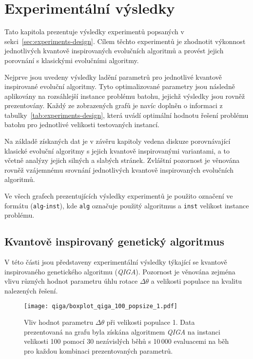 \chapter{Experimentální výsledky} \label{chapt:experiments}
Tato kapitola prezentuje výsledky experimentů popsaných v sekci~\ref{sec:experiments-design}. 
Cílem těchto experimentů je zhodnotit výkonnost jednotlivých kvantově inspirovaných evolučních algoritmů a provést jejich porovnání s klasickými evolučními algoritmy. 

Nejprve jsou uvedeny výsledky ladění parametrů pro jednotlivé kvantově inspirované evoluční algoritmy. 
Tyto optimalizované parametry jsou následně aplikovány na rozsáhlejší instance problému batohu, jejichž výsledky jsou rovněž prezentovány. 
Každý ze zobrazených grafů je navíc doplněn o informaci z tabulky~\ref{tab:experiments-design}, která uvádí optimální hodnotu řešení problému batohu pro jednotlivé velikosti testovaných instancí.

Na základě získaných dat je v závěru kapitoly vedena diskuze porovnávající klasické evoluční algoritmy s jejich kvantově inspirovanými variantami, a to včetně analýzy jejich silných a slabých stránek. 
Zvláštní pozornost je věnována rovněž vzájemnému srovnání jednotlivých kvantově inspirovaných evolučních algoritmů. 

Ve všech grafech prezentujících výsledky experimentů je použito označení ve formátu (\texttt{alg}-\texttt{inst}), kde \texttt{alg} označuje použitý algoritmus a \texttt{inst} velikost instance problému. 

\section{Kvantově inspirovaný genetický algoritmus}\label{sec:exp-qisa}
V této části jsou představeny experimentální výsledky týkající se kvantově inspirovaného genetického algoritmu (\emph{QIGA}). 
Pozornost je věnována zejména vlivu různých hodnot parametru úhlu rotace $\Delta\theta$ a velikosti populace na kvalitu nalezených řešení. 

\begin{figure}[ht!]
    \centering
    \texttt{[image: qiga/boxplot\_qiga\_100\_popsize\_1.pdf]}
    \caption{Vliv hodnot parametru $\Delta\theta$ při velikosti populace 1. Data prezentovaná na grafu byla získána algoritmem \emph{QIGA} na instanci velikosti 100 pomocí 30 nezávislých běhů s 10\,000 evaluacemi na běh pro každou kombinaci prezentovaných parametrů.}
    \label{fig:qiga-pop1}
\end{figure}

